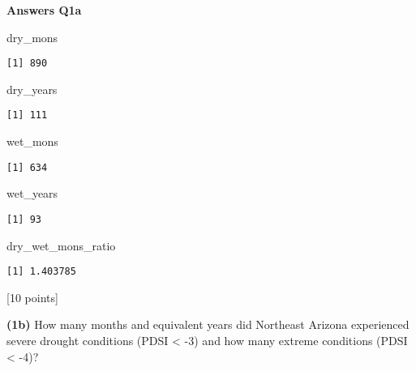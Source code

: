 \documentclass[
  letterpaper,
  DIV=11,
  numbers=noendperiod]{scrartcl}
\newenvironment{Shaded}{\begin{snugshade}}{\end{snugshade}}
\newcommand{\NormalTok}[1]{\textcolor[rgb]{0.00,0.23,0.31}{#1}}
\begin{document}
\textbf{Answers Q1a}

\begin{Shaded}
\begin{Highlighting}[]
\NormalTok{dry\_mons}
\end{Highlighting}
\end{Shaded}

\begin{verbatim}
[1] 890
\end{verbatim}

\begin{Shaded}
\begin{Highlighting}[]
\NormalTok{dry\_years}
\end{Highlighting}
\end{Shaded}

\begin{verbatim}
[1] 111
\end{verbatim}

\begin{Shaded}
\begin{Highlighting}[]
\NormalTok{wet\_mons}
\end{Highlighting}
\end{Shaded}

\begin{verbatim}
[1] 634
\end{verbatim}

\begin{Shaded}
\begin{Highlighting}[]
\NormalTok{wet\_years}
\end{Highlighting}
\end{Shaded}

\begin{verbatim}
[1] 93
\end{verbatim}

\begin{Shaded}
\begin{Highlighting}[]
\NormalTok{dry\_wet\_mons\_ratio}
\end{Highlighting}
\end{Shaded}

\begin{verbatim}
[1] 1.403785
\end{verbatim}

{[}10 points{]}

\textbf{(1b)} How many months and equivalent years did Northeast Arizona
experienced severe drought conditions (PDSI \textless{} -3) and how many
extreme conditions (PDSI \textless{} -4)?
\end{document}
